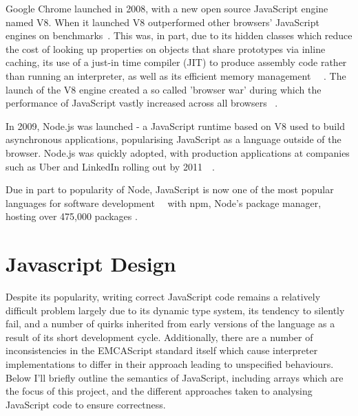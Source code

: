 \documentclass[]{final_report}
\begin{document}
Google Chrome launched in 2008, with a new open source JavaScript engine named V8. When it launched V8 outperformed other browsers' JavaScript engines on benchmarks~\cite{chromebenchmarks}. This was, in part, due to its hidden classes which reduce the cost of looking up properties on objects that share prototypes via inline caching, its use of a just-in time compiler (JIT) to produce assembly code rather than running an interpreter, as well as its efficient memory management ~\cite{chromeengine}~\cite{chromeengine2}. The launch of the V8 engine created a so called 'browser war' during which the performance of JavaScript vastly increased across all browsers ~\cite{knowyourenginesmozilla}.

In 2009, Node.js was launched - a JavaScript runtime based on V8 used to build asynchronous applications, popularising JavaScript as a language outside of the browser. Node.js was quickly adopted, with production applications at companies such as Uber and LinkedIn rolling out by 2011~\cite{linkedinusesnode}~\cite{uberusesnode}. 

Due in part to popularity of Node, JavaScript is now one of the most popular languages for software development~\cite{stackoverflowsurvey}~\cite{tiobeindex2017nov} with npm, Node's package manager, hosting over 475,000 packages \cite{npm}.

\section{Javascript Design}

Despite its popularity, writing correct JavaScript code remains a relatively difficult problem largely due to its dynamic type system, its tendency to silently fail, and a number of quirks inherited from early versions of the language as a result of its short development cycle. Additionally, there are a number of inconsistencies in the EMCAScript standard itself which cause interpreter implementations to differ in their approach leading to unspecified behaviours. ~\cite{park2015kjs} Below I'll briefly outline the semantics of JavaScript, including arrays which are the focus of this project, and the different approaches taken to analysing JavaScript code to ensure correctness.
\end{document}
